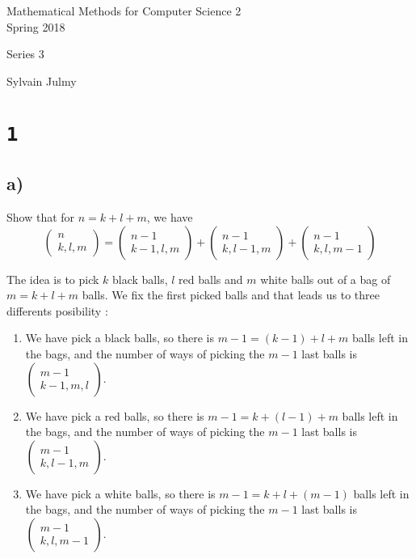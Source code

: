 \documentclass[a4paper,11pt]{report}
\author{Sylvain Julmy}
\date{\today}
\begin{document}
\begin{center}
  \Large{
    Mathematical Methods for Computer Science 2\\
    Spring 2018
  }
  \noindent\makebox[\linewidth]{\rule{\linewidth}{0.4pt}}

  Series 3
  \vspace*{1.4cm}

  Sylvain Julmy
  
  \noindent\makebox[\linewidth]{\rule{\linewidth}{0.4pt}}
\end{center}

\section*{\texttt{1}}
\subsection*{a)}

Show that for $n = k + l + m$, we have
$$
\begin{pmatrix} n \\ k,l,m\end{pmatrix} = \begin{pmatrix} n-1 \\
  k-1,l,m\end{pmatrix} + \begin{pmatrix} n-1 \\ k,l-1,m\end{pmatrix} + \begin{pmatrix} n-1 \\ k,l,m-1\end{pmatrix}
$$

The idea is to pick $k$ black balls, $l$ red balls and $m$ white balls out of a
bag of $m = k + l + m$ balls. We fix the first picked balls and that leads us to
three differents posibility :
\begin{enumerate}
\item We have pick a black balls, so there is $m-1 = (k-1) + l + m$ balls left in
  the bags, and the number of ways of picking the $m-1$ last balls is
  $\begin{pmatrix} m-1 \\ k-1,m,l\end{pmatrix}$.
\item We have pick a red balls, so there is $m-1 = k + (l-1) + m$ balls left in
  the bags, and the number of ways of picking the $m-1$ last balls is
  $\begin{pmatrix} m-1 \\ k,l-1,m\end{pmatrix}$.
\item We have pick a white balls, so there is $m-1 = k + l + (m-1)$ balls left in
  the bags, and the number of ways of picking the $m-1$ last balls is
  $\begin{pmatrix} m-1 \\ k,l,m-1\end{pmatrix}$.
\end{enumerate}
\end{document}
